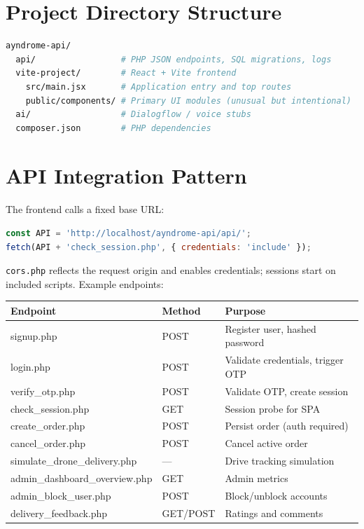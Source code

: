 \documentclass[12pt,a4paper,oneside]{report}
\begin{document}
\section{Project Directory Structure}
\begin{lstlisting}[language=bash, caption={Repository layout (abbreviated)}]
ayndrome-api/
  api/                 # PHP JSON endpoints, SQL migrations, logs
  vite-project/        # React + Vite frontend
    src/main.jsx       # Application entry and top routes
    public/components/ # Primary UI modules (unusual but intentional)
  ai/                  # Dialogflow / voice stubs
  composer.json        # PHP dependencies
\end{lstlisting}

\section{API Integration Pattern}
The frontend calls a fixed base URL:
\begin{lstlisting}[language=JavaScript]
const API = 'http://localhost/ayndrome-api/api/';
fetch(API + 'check_session.php', { credentials: 'include' });
\end{lstlisting}
\texttt{cors.php} reflects the request origin and enables credentials; sessions start on
included scripts. Example endpoints:

\begin{longtable}{@{}p{}p{}p{}@{}}
    \toprule
    \textbf{Endpoint} & \textbf{Method} & \textbf{Purpose} \\
    \midrule
    \endhead
    signup.php & POST & Register user, hashed password \\
    login.php & POST & Validate credentials, trigger OTP \\
    verify\_otp.php & POST & Validate OTP, create session \\
    check\_session.php & GET & Session probe for SPA \\
    create\_order.php & POST & Persist order (auth required) \\
    cancel\_order.php & POST & Cancel active order \\
    simulate\_drone\_delivery.php & --- & Drive tracking simulation \\
    admin\_dashboard\_overview.php & GET & Admin metrics \\
    admin\_block\_user.php & POST & Block/unblock accounts \\
    delivery\_feedback.php & GET/POST & Ratings and comments \\
    \bottomrule
\end{longtable}
\end{document}
